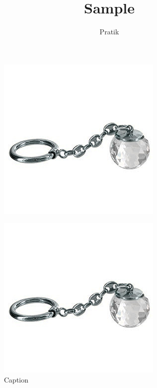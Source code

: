 \documentclass[12pt]{article}
\begin{document}
\title{Sample}
\author{Pratik}\maketitle

\begin{figure}[p]
\centering
\includegraphics{sample.jpeg}
\end{figure}
\begin{figure}[p]
\centering
\includegraphics{sample.jpeg}
\caption{Caption}
\end{figure}
\end{document}
